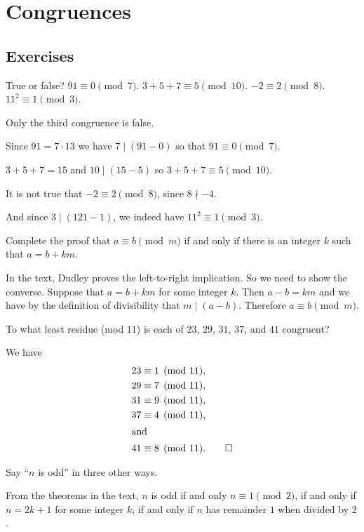 \chapter{Congruences}

\section{Exercises}

 True or false? $91\equiv0\pmod7$.
$3 + 5 + 7 \equiv 5\pmod{10}$. $-2\equiv2\pmod8$. $11^2\equiv1\pmod3$.
\begin{solution}
  Only the third congruence is false.

  Since $91 = 7\cdot13$ we have $7\mid(91-0)$ so that
  $91\equiv0\pmod7$.

  $3 + 5 + 7 = 15$ and $10\mid(15-5)$ so $3 + 5 + 7 \equiv 5\pmod{10}$.

  It is not true that $-2\equiv2\pmod8$, since $8\nmid-4$.

  And since $3\mid(121 - 1)$, we indeed have $11^2\equiv1\pmod3$.
\end{solution}

 Complete the proof that $a\equiv b\pmod m$ if and only if
there is an integer $k$ such that $a = b + km$.
\begin{solution}
  In the text, Dudley proves the left-to-right implication. So we need
  to show the converse. Suppose that $a = b + km$ for some integer
  $k$. Then $a - b = km$ and we have by the definition of divisibility
  that $m\mid(a - b)$. Therefore $a\equiv b\pmod{m}$.
\end{solution}

 To what least residue (mod $11$) is each of $23$, $29$,
$31$, $37$, and $41$ congruent?
\begin{solution}
  We have
  \begin{align*}
    23 &\equiv 1\pmod{11}, \\
    29 &\equiv 7\pmod{11}, \\
    31 &\equiv 9\pmod{11}, \\
    37 &\equiv 4\pmod{11}, \\
    \intertext{and}
    41 &\equiv 8\pmod{11}. \qedhere
  \end{align*}
\end{solution}

 Say ``$n$ is odd'' in three other ways.
\begin{solution}
  From the theorems in the text, $n$ is odd if and only
  $n\equiv1\pmod2$, if and only if $n = 2k + 1$ for some integer $k$,
  if and only if $n$ has remainder $1$ when divided by $2$.
\end{solution}

